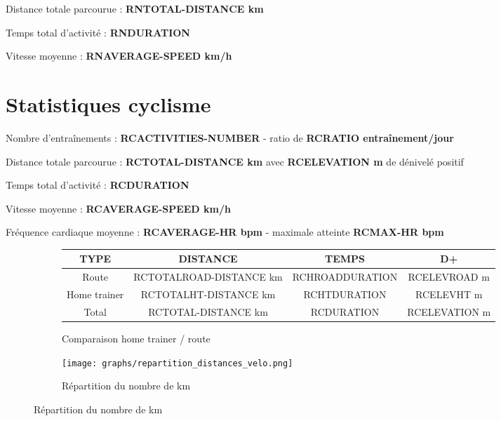\documentclass[a4paper,french,11pt]{report}
\begin{document}
\textbullet Distance totale parcourue : \textbf{RNTOTAL-DISTANCE km}

\textbullet Temps total d'activité : \textbf{RNDURATION}

\textbullet Vitesse moyenne : \textbf{RNAVERAGE-SPEED km/h}


\section*{Statistiques cyclisme}
\thispagestyle{empty}

\textbullet Nombre d'entraînements : \textbf{RCACTIVITIES-NUMBER} - ratio de \textbf{RCRATIO entraînement/jour}

\textbullet Distance totale parcourue : \textbf{RCTOTAL-DISTANCE km} avec \textbf{RCELEVATION m} de dénivelé positif

\textbullet Temps total d'activité : \textbf{RCDURATION}

\textbullet Vitesse moyenne : \textbf{RCAVERAGE-SPEED km/h}

\textbullet Fréquence cardiaque moyenne : \textbf{RCAVERAGE-HR bpm} - maximale atteinte \textbf{RCMAX-HR bpm}

\begin{figure}[!ht]
	\begin{subfigure}{.49\linewidth}
	
	\centering
	
	\begin{tabular}{|c|c|c|c|}
		\hline
		\textbf{TYPE}         & \textbf{DISTANCE}                & \textbf{TEMPS}           & \textbf{D+}           \\ \hline
		Route        & RCTOTALROAD-DISTANCE km & RCHROADDURATION & RCELEVROAD m  \\ \hline
		Home trainer & RCTOTALHT-DISTANCE km   & RCHTDURATION    & RCELEVHT m    \\ \hline
		Total        & RCTOTAL-DISTANCE km     & RCDURATION      & RCELEVATION m \\ \hline
		\end{tabular}
		\caption*{Comparaison home trainer / route}

	\end{subfigure}\hfill
	\begin{subfigure}{.49\linewidth}
	
	\centering
	
	\texttt{[image: graphs/repartition\_distances\_velo.png]}
	\caption*{Répartition du nombre de km}
	
	\end{subfigure}
	
	\end{figure}
	
\end{document}
